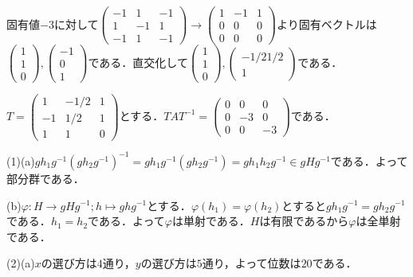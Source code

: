 \documentclass[
		book,
		head_space=20mm,
		foot_space=20mm,
		gutter=10mm,
		line_length=190mm
]{jlreq}
\begin{document}
固有値$-3$に対して$\begin{pmatrix}
    -1 & 1 & -1\\
    1 & -1 & 1\\
    -1 & 1 & -1
\end{pmatrix}\rightarrow \begin{pmatrix}
    1 & -1 & 1\\
    0 & 0 & 0\\
    0 & 0 & 0
\end{pmatrix}$より固有ベクトルは$\begin{pmatrix}
    1\\
    1\\
    0
\end{pmatrix},\begin{pmatrix}
    -1\\
    0\\
    1
\end{pmatrix}$である．直交化して$\begin{pmatrix}
    1\\
    1\\
    0
\end{pmatrix},\begin{pmatrix}
    -1/2
    1/2\\
    1
\end{pmatrix}$である．

$T=\begin{pmatrix}
    1 & -1/2 & 1\\
    -1 & 1/2 & 1\\
    1 & 1 & 0
    \end{pmatrix}$とする．$TAT^{-1}=\begin{pmatrix}
    0 & 0 & 0\\
    0 & -3 & 0\\
    0 & 0 & -3
\end{pmatrix}$である．

(1)(a)$gh_1g^{-1}(gh_2g^{-1})^{-1}=gh_1g^{-1}(gh_2g^{-1})=gh_1h_2g^{-1}\in gHg^{-1}$である．よって部分群である．

(b)$\varphi\colon H \rightarrow gHg^{-1};h \mapsto ghg^{-1}$とする．$\varphi(h_1)=\varphi(h_2)$とすると$gh_1g^{-1}=gh_2g^{-1}$である．$h_1=h_2$である．よって$\varphi$は単射である．$H$は有限であるから$\varphi$は全単射である．

(2)(a)$x$の選び方は$4$通り，$y$の選び方は$5$通り，よって位数は$20$である．
\end{document}
